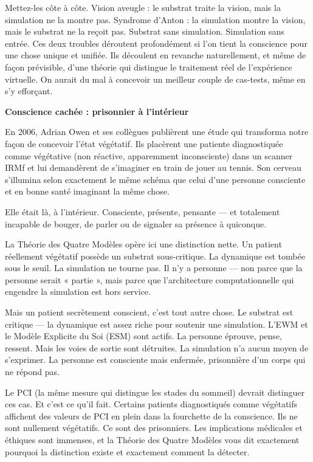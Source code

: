 \documentclass[11pt, twoside, openright]{book}
\begin{document}
Mettez-les côte à côte. Vision aveugle : le substrat traite la vision, mais la simulation ne la montre pas. Syndrome d'Anton : la simulation montre la vision, mais le substrat ne la reçoit pas. Substrat sans simulation. Simulation sans entrée. Ces deux troubles déroutent profondément si l'on tient la conscience pour une chose unique et unifiée. Ils découlent en revanche naturellement, et même de façon prévisible, d'une théorie qui distingue le traitement réel de l'expérience virtuelle. On aurait du mal à concevoir un meilleur couple de cas-tests, même en s'y efforçant.

\textbf{Conscience cachée : prisonnier à l'intérieur}

En 2006, Adrian Owen et ses collègues publièrent une étude qui transforma notre façon de concevoir l'état végétatif. Ils placèrent une patiente diagnostiquée comme végétative (non réactive, apparemment inconsciente) dans un scanner IRMf et lui demandèrent de s'imaginer en train de jouer au tennis. Son cerveau s'illumina selon exactement le même schéma que celui d'une personne consciente et en bonne santé imaginant la même chose.

Elle était là, à l'intérieur. Consciente, présente, pensante --- et totalement incapable de bouger, de parler ou de signaler sa présence à quiconque.

La Théorie des Quatre Modèles opère ici une distinction nette. Un patient réellement végétatif possède un substrat sous-critique. La dynamique est tombée sous le seuil. La simulation ne tourne pas. Il n'y a personne --- non parce que la personne serait « partie », mais parce que l'architecture computationnelle qui engendre la simulation est hors service.

Mais un patient secrètement conscient, c'est tout autre chose. Le substrat est critique --- la dynamique est assez riche pour soutenir une simulation. L'EWM et le Modèle Explicite du Soi (ESM) sont actifs. La personne éprouve, pense, ressent. Mais les voies de sortie sont détruites. La simulation n'a aucun moyen de s'exprimer. La personne est consciente mais enfermée, prisonnière d'un corps qui ne répond pas.

Le PCI (la même mesure qui distingue les stades du sommeil) devrait distinguer ces cas. Et c'est ce qu'il fait. Certains patients diagnostiqués comme végétatifs affichent des valeurs de PCI en plein dans la fourchette de la conscience. Ils ne sont nullement végétatifs. Ce sont des prisonniers. Les implications médicales et éthiques sont immenses, et la Théorie des Quatre Modèles vous dit exactement pourquoi la distinction existe et exactement comment la détecter.
\end{document}
